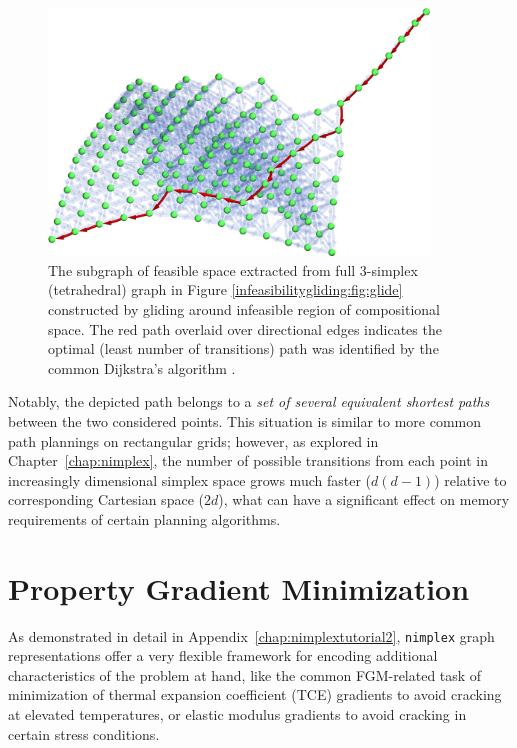 \begin{figure}[H]
    \centering
    \includegraphics[width=0.9\textwidth]{pathplanning/InfeasibilityGliding_Feasible.png}
    \caption{The subgraph of feasible space extracted from full 3-simplex (tetrahedral) graph in Figure \ref{infeasibilitygliding:fig:glide} constructed by gliding around infeasible region of compositional space. The red path overlaid over directional edges indicates the optimal (least number of transitions) path was identified by the common Dijkstra's algorithm \cite{Dijkstra1959AGraphs}.}
    \label{pathplan:fig:shortestpath}
\end{figure}

Notably, the depicted path belongs to a \emph{set of several equivalent shortest paths} between the two considered points. This situation is similar to more common path plannings on rectangular grids; however, as explored in Chapter~\ref{chap:nimplex}, the number of possible transitions from each point in increasingly dimensional simplex space grows much faster ($d(d-1)$) relative to corresponding Cartesian space ($2d$), what can have a significant effect on memory requirements of certain planning algorithms.

\section{Property Gradient Minimization} \label{pathplan:sec:gradientmin}

As demonstrated in detail in Appendix~\ref{chap:nimplextutorial2}, \texttt{nimplex} graph representations offer a very flexible framework for encoding additional characteristics of the problem at hand, like the common FGM-related task of minimization of thermal expansion coefficient (TCE) gradients \cite{Kirk2021ComputationalMonotonicity} to avoid cracking at elevated temperatures, or elastic modulus gradients to avoid cracking in certain stress conditions.



